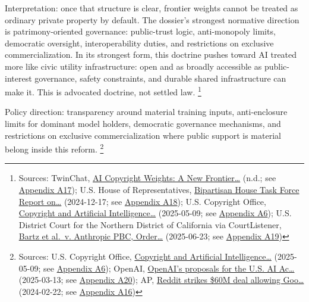 \documentclass[
  american,
  11pt,
  letterpaper,
]{article}
\begin{document}
Interpretation: once that structure is clear, frontier weights cannot be
treated as ordinary private property by default. The dossier's strongest
normative direction is patrimony-oriented governance: public-trust
logic, anti-monopoly limits, democratic oversight, interoperability
duties, and restrictions on exclusive commercialization. In its
strongest form, this doctrine pushes toward AI treated more like civic
utility infrastructure: open and as broadly accessible as
public-interest governance, safety constraints, and durable shared
infrastructure can make it. This is advocated doctrine, not settled law.
\footnote{Sources: TwinChat,
  \href{https://medium.com/twinchat/ai-copyright-weights-a-new-frontier-in-intellectual-property-law-d8ee1b6c55ee}{AI
  Copyright Weights: A New Frontier\ldots{}} (n.d.; see
  \hyperref[ch-10-appendix-a17-ai-copyright-weights-a-new-frontier-in-intellectual-property-law]{Appendix
  A17}); U.S. House of Representatives,
  \href{https://www.speaker.gov/wp-content/uploads/2024/12/AI-Task-Force-Report-FINAL.pdf}{Bipartisan
  House Task Force Report on\ldots{}} (2024-12-17; see
  \hyperref[ch-10-appendix-a18-bipartisan-house-task-force-report-on-artificial-intelligence]{Appendix
  A18}); U.S. Copyright Office,
  \href{https://copyright.gov/ai/Copyright-and-Artificial-Intelligence-Part-3-Generative-AI-Training-Report-Pre-Publication-Version.pdf}{Copyright
  and Artificial Intelligence\ldots{}} (2025-05-09; see
  \hyperref[ch-10-appendix-a6-copyright-and-artificial-intelligence-part-3-generative-ai-training-pre-publication-version]{Appendix
  A6}); U.S. District Court for the Northern District of California via
  CourtListener,
  \href{https://storage.courtlistener.com/recap/gov.uscourts.cand.434709/gov.uscourts.cand.434709.231.0_3.pdf}{Bartz
  et al.~v. Anthropic PBC, Order\ldots{}} (2025-06-23; see
  \hyperref[ch-10-appendix-a19-bartz-et-al-v-anthropic-pbc-order-on-fair-use]{Appendix
  A19})}

Policy direction: transparency around material training inputs,
anti-enclosure limits for dominant model holders, democratic governance
mechanisms, and restrictions on exclusive commercialization where public
support is material belong inside this reform. \footnote{Sources: U.S.
  Copyright Office,
  \href{https://copyright.gov/ai/Copyright-and-Artificial-Intelligence-Part-3-Generative-AI-Training-Report-Pre-Publication-Version.pdf}{Copyright
  and Artificial Intelligence\ldots{}} (2025-05-09; see
  \hyperref[ch-10-appendix-a6-copyright-and-artificial-intelligence-part-3-generative-ai-training-pre-publication-version]{Appendix
  A6}); OpenAI,
  \href{https://openai.com/global-affairs/openai-proposals-for-the-us-ai-action-plan/}{OpenAI's
  proposals for the U.S. AI Ac\ldots{}} (2025-03-13; see
  \hyperref[ch-10-appendix-a20-openais-proposals-for-the-us-ai-action-plan]{Appendix
  A20}); AP,
  \href{https://apnews.com/article/a7f131c7cb4225307134ef21d3c6a708}{Reddit
  strikes \$60M deal allowing Goo\ldots{}} (2024-02-22; see
  \hyperref[ch-10-appendix-a16-reddit-strikes-60m-deal-allowing-google-to-train-ai-models-on-its-posts-unveils-ipo-plans]{Appendix
  A16})}
\end{document}
